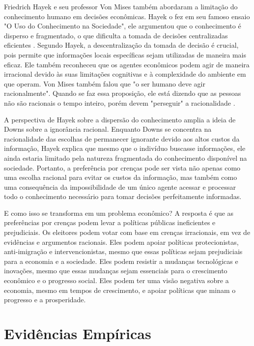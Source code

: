 Friedrich Hayek e seu professor Von Mises também abordaram a limitação do conhecimento humano em decisões econômicas. Hayek o fez em seu famoso ensaio "O Uso do Conhecimento na Sociedade", ele argumentou que o conhecimento é disperso e fragmentado, o que dificulta a tomada de decisões centralizadas eficientes \cite{hayek_knowledge_use}. Segundo Hayek, a descentralização da tomada de decisão é crucial, pois permite que informações locais específicas sejam utilizadas de maneira mais eficaz. Ele também reconheceu que os agentes econômicos podem agir de maneira irracional devido às suas limitações cognitivas e à complexidade do ambiente em que operam. Von Mises também falou que "o ser humano deve agir racionalmente". Quando se faz essa proposição, ele está dizendo que as pessoas não são racionais o tempo inteiro, porém devem "perseguir" a racionalidade \cite{von1949human}.

A perspectiva de Hayek sobre a dispersão do conhecimento amplia a ideia de Downs sobre a ignorância racional. Enquanto Downs se concentra na racionalidade das escolhas de permanecer ignorante devido aos altos custos da informação, Hayek explica que mesmo que o indivíduo buscasse informações, ele ainda estaria limitado pela natureza fragmentada do conhecimento disponível na sociedade. Portanto, a preferência por crenças pode ser vista não apenas como uma escolha racional para evitar os custos da informação, mas também como uma consequência da impossibilidade de um único agente acessar e processar todo o conhecimento necessário para tomar decisões perfeitamente informadas.

E como isso se transforma em um problema econômico? A resposta é que as preferências por crenças podem levar a políticas públicas ineficientes e prejudiciais. Os eleitores podem votar com base em crenças irracionais, em vez de evidências e argumentos racionais. Eles podem apoiar políticas protecionistas, anti-imigração e intervencionistas, mesmo que essas políticas sejam prejudiciais para a economia e a sociedade. Eles podem resistir a mudanças tecnológicas e inovações, mesmo que essas mudanças sejam essenciais para o crescimento econômico e o progresso social. Eles podem ter uma visão negativa sobre a economia, mesmo em tempos de crescimento, e apoiar políticas que minam o progresso e a prosperidade.


\section{Evidências Empíricas}


